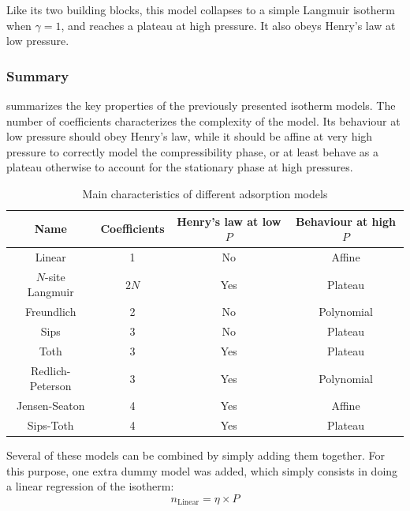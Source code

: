 \documentclass[main.tex]{subfiles}
\begin{document}
Like its two building blocks, this model collapses to a simple Langmuir isotherm when $\gamma = 1$, and reaches a plateau at high pressure. It also obeys Henry's law at low pressure.

\subsubsection{Summary}

 summarizes the key properties of the previously presented isotherm models. The number of coefficients characterizes the complexity of the model. Its behaviour at low pressure should obey Henry's law, while it should be affine at very high pressure to correctly model the compressibility phase, or at least behave as a plateau otherwise to account for the stationary phase at high pressures.

\begin{table}[h]
	\centering
	\begin{tabular}{|c|c|c|c|}
		\hline
		\bf Name & \bf Coefficients & \bf Henry's law at low $P$ & \bf Behaviour at high $P$\\\hline
		Linear & 1 & \cellcolor{red!25}No & \cellcolor{green!25}Affine\\\hline
		$N$-site Langmuir & $2N$ & \cellcolor{green!25}Yes & \cellcolor{yellow!25}Plateau \\\hline
		Freundlich & 2 & \cellcolor{red!25} No & \cellcolor{red!25}Polynomial \\\hline
		Sips & 3 & \cellcolor{red!25}No & \cellcolor{yellow!25}Plateau \\\hline
		Toth & 3 & \cellcolor{green!25}Yes & \cellcolor{yellow!25}Plateau \\\hline
		Redlich-Peterson & 3 & \cellcolor{green!25}Yes & \cellcolor{red!25}Polynomial \\\hline
		Jensen-Seaton & 4 & \cellcolor{green!25}Yes & \cellcolor{green!25}Affine \\\hline
		Sips-Toth & 4 & \cellcolor{green!25}Yes & \cellcolor{yellow!25}Plateau \\\hline
	\end{tabular}
	\caption{Main characteristics of different adsorption models}\label{table:adsorptionmodels}
\end{table}

Several of these models can be combined by simply adding them together. For this purpose, one extra dummy model was added, which simply consists in doing a linear regression of the isotherm:
\[n_\text{Linear} = \eta\times P\]
\end{document}
